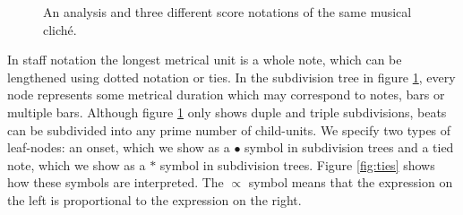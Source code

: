 \begin{figure}[t]
\centering
{}

\caption{An analysis and three different score notations of the same musical clich\'e. }
\label{fig:subdivision}
\end{figure}

In staff notation the longest metrical unit is a whole note, which can be lengthened using dotted notation or ties. In the subdivision tree in figure \ref{fig:subdivision}, every node represents some metrical duration which may correspond to notes, bars or multiple bars. Although figure \ref{fig:subdivision} only shows duple and triple subdivisions, beats can be subdivided into any prime number of child-units. We specify two types of leaf-nodes: an onset, which we show as a $\bullet$ symbol in subdivision trees and a tied note, which we show as a $*$ symbol in subdivision trees. Figure \ref{fig:ties} shows how these symbols are interpreted. The $\propto$ symbol means that the expression on the left is proportional to the expression on the right.

